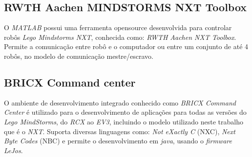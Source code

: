
\subsection{RWTH Aachen MINDSTORMS NXT Toolbox}
\label{subsec:rwth}
O \emph{MATLAB} possui uma ferramenta opensource desenvolvida para controlar robôs \emph{Lego Mindstorms NXT}, conhecida como: \emph{RWTH Aachen NXT Toolbox}. Permite a comunicação entre robô e o computador ou entre um conjunto de até 4 robôs, no modelo de comunicação mestre/escravo. 

\subsection{BRICX Command center}
\label{subsec:Bricx}
O ambiente de desenvolvimento integrado conhecido como \emph{BRICX Command Center} é utilizado para o desenvolvimento de aplicações para todas as versões do \emph{Lego MindStorms}, do \emph{RCX} ao \emph{EV3}, incluindo o modelo utilizado neste trabalho que é o \emph{NXT}. Suporta diversas linguagens como: \emph{Not eXactly C} (NXC), \emph{Next Byte Codes} (NBC) e permite o desenvolvimento em \emph{java}, usando o \emph{firmware LeJos}. %

